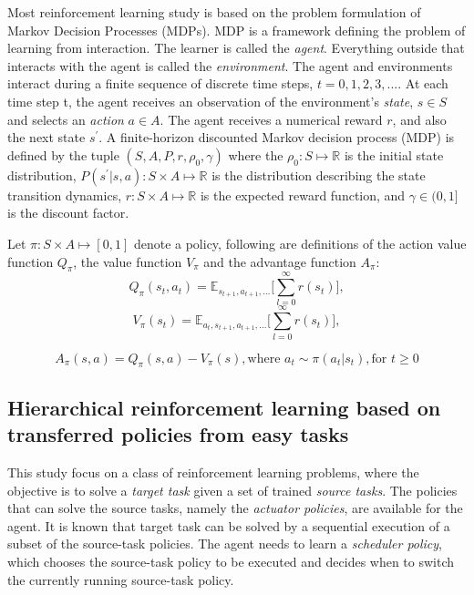 Most reinforcement learning study is based on the problem formulation of Markov Decision Processes (MDPs). MDP is a framework defining the problem of learning from interaction. The learner is called the \textit{agent}. Everything outside that interacts with the agent is called the \textit{environment}.
The agent and environments interact during a finite sequence of discrete time steps, $t=0,1,2,3,...$. At each time step t, the agent receives an observation of the environment's \textit{state}, $s \in S$ and selects an \textit{action} $a \in A$. The agent receives a numerical reward $r$, and also the next state $s^\prime$.  A finite-horizon discounted Markov decision process (MDP) is defined by the tuple $(S,A,P,r,\rho_0,\gamma) $ where the $\rho_0 : S \mapsto \mathbb{R}$ is the initial state distribution, $P(s^\prime|s,a) : S \times A \mapsto \mathbb{R}$ is the distribution describing the state transition dynamics, $r : S \times A \mapsto \mathbb{R}$ is the expected reward function, and $\gamma \in (0,1]$ is the discount factor.

Let $\pi : S \times A \mapsto [0,1] $ denote a policy, following are definitions of the action value function $Q_\pi $, the value function $V_\pi $ and the advantage function $A_\pi $:
$$ Q_\pi(s_t,a_t) = \mathbb{E}_{s_{t+1},a_{t+1},\ldots}
\big[ \sum_{l=0}^\infty r(s_{t}) \big],$$
$$ V_\pi(s_t) = \mathbb{E}_{a_{t},s_{t+1},a_{t+1},\ldots}
\big[ \sum_{l=0}^\infty r(s_{t}) \big],$$

$$ A_\pi (s,a) = Q_\pi (s,a) - V_\pi (s), \text{where } a_t \sim \pi (a_t|s_t), \text{for } t \geq 0 $$

\subsection{Hierarchical reinforcement learning based on transferred policies from easy tasks}\label{sec_hier_trans}

This study focus on a class of reinforcement learning problems, where the objective is to solve a \textit{target task } given a set of trained \textit{source tasks}. The policies that can solve the source tasks, namely the \textit{actuator policies}, are available for the agent. It is known that target task can be solved by a sequential execution of a subset of the source-task policies. The agent needs to learn a \textit{scheduler policy}, which chooses the source-task policy to be executed and decides when to switch the currently running source-task policy.

